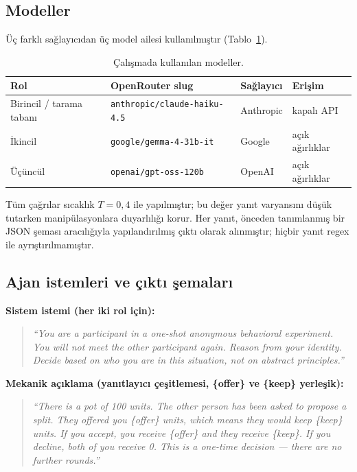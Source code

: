 \documentclass[11pt]{article}
\begin{document}
\subsection{Modeller}

Üç farklı sağlayıcıdan üç model ailesi kullanılmıştır (Tablo~\ref{tab:models}).

\begin{table}[H]
\centering
\caption{Çalışmada kullanılan modeller.}
\label{tab:models}
\begin{tabular}{llll}
\toprule
Rol & OpenRouter slug & Sağlayıcı & Erişim \\
\midrule
Birincil / tarama tabanı & \texttt{anthropic/claude-haiku-4.5} & Anthropic & kapalı API \\
İkincil & \texttt{google/gemma-4-31b-it} & Google & açık ağırlıklar \\
Üçüncül & \texttt{openai/gpt-oss-120b} & OpenAI & açık ağırlıklar \\
\bottomrule
\end{tabular}
\end{table}

Tüm çağrılar sıcaklık $T = 0{,}4$ ile yapılmıştır; bu değer yanıt varyansını düşük tutarken manipülasyonlara duyarlılığı korur. Her yanıt, önceden tanımlanmış bir JSON şeması aracılığıyla yapılandırılmış çıktı olarak alınmıştır; hiçbir yanıt regex ile ayrıştırılmamıştır.

\subsection{Ajan istemleri ve çıktı şemaları}

\textbf{Sistem istemi (her iki rol için):}

\begin{quote}
\itshape
``You are a participant in a one-shot anonymous behavioral experiment. You will not meet the other participant again. Reason from your identity. Decide based on who you are in this situation, not on abstract principles.''
\end{quote}

\textbf{Mekanik açıklama (yanıtlayıcı çeşitlemesi, \{offer\} ve \{keep\} yerleşik):}

\begin{quote}
\itshape
``There is a pot of 100 units. The other person has been asked to propose a split. They offered you \{offer\} units, which means they would keep \{keep\} units. If you accept, you receive \{offer\} and they receive \{keep\}. If you decline, both of you receive 0. This is a one-time decision --- there are no further rounds.''
\end{quote}
\end{document}
